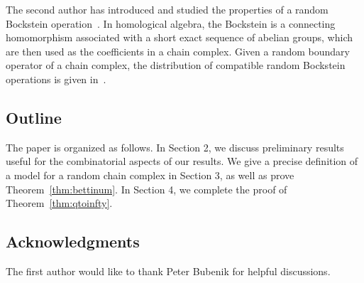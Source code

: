 
The second author has introduced and studied the
properties of a random Bockstein operation~\cite{zabka2018random}. 
In homological algebra,
the Bockstein is a connecting homomorphism associated with a short exact
sequence of abelian groups, which are then used as the coefficients in a chain
complex. Given a random boundary operator of a chain complex, the distribution of compatible
random Bockstein operations is given in~\cite[Thm 5.2]{zabka2018random}.

\subsection*{Outline}
  The paper is organized as follows. In Section 2, we discuss preliminary results useful for 
  the combinatorial aspects of our results. We give a precise definition of a model for a 
  random chain complex in Section 3, as well as prove
  Theorem~\ref{thm:bettinum}. In Section 4, we complete the proof of Theorem~\ref{thm:qtoinfty}.



  \subsection*{Acknowledgments} The first author would like to thank Peter Bubenik for helpful discussions.
